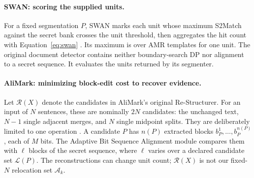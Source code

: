 \documentclass[10pt]{article}
\begin{document}
\paragraph{SWAN: scoring the supplied units.}
For a fixed segmentation $P$, SWAN marks each unit whose maximum S2Match
against the secret bank crosses the unit threshold, then aggregates the hit
count with Equation~\ref{eq:swan} \citep{ye2026swan}. Its maximum is over AMR
templates for one unit. The original document detector contains neither
boundary-search DP nor alignment to a secret sequence. It evaluates the
units returned by its segmenter.

\paragraph{AliMark: minimizing block-edit cost to recover evidence.}
Let $\mathcal R(X)$ denote the candidates in AliMark's original
Re-Structurer. For an input of $N$ sentences, these are nominally $2N$
candidates: the unchanged text, $N-1$ single adjacent merges, and $N$
single midpoint splits. They are deliberately limited to one operation
\citep[Section~3.2.1]{li2026alimark}. A candidate $P$ has $n(P)$ extracted
blocks $b_P^1,\ldots,b_P^{n(P)}$, each of $M$ bits. The Adaptive Bit Sequence
Alignment module compares them with $\ell$ blocks of the secret sequence,
where $\ell$ varies over a declared candidate set $\mathcal L(P)$.
The reconstructions can change unit count; $\mathcal R(X)$ is not our
fixed-$N$ relocation set $\mathcal A_k$.
\end{document}
